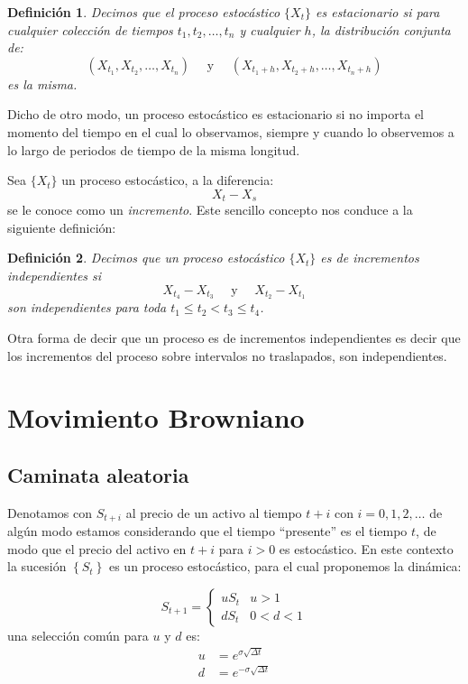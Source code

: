 \documentclass{extreport}
\theoremstyle{definicion}
\newtheorem{definition}{Definición}[chapter]
\theoremstyle{propiedad}
\theoremstyle{teorema}
\begin{document}
\begin{definition}
Decimos que el proceso estocástico $\{X_t\}$ es \emph{estacionario} si para cualquier colección de tiempos $t_1, t_2, \ldots, t_n$ y cualquier $h$, la distribución conjunta de:
$$
(X_{t_1}, X_{t_2}, \ldots, X_{t_n}) \quad\text{ y }\quad (X_{t_1+h}, X_{t_2+h}, \ldots, X_{t_n+h})
$$
es la misma.
\end{definition}

Dicho de otro modo, un proceso estocástico es estacionario si no importa el momento del tiempo en el cual lo observamos, siempre y cuando lo observemos a lo largo de periodos de tiempo de la misma longitud. 

Sea $\{X_t\}$ un proceso estocástico, a la diferencia:
$$
X_t-X_s
$$
se le conoce como un \emph{incremento}. Este sencillo concepto nos conduce a la siguiente definición:
 \begin{definition}
     Decimos que un proceso estocástico $\{X_t\}$ es de \emph{incrementos independientes} si
     $$
     X_{t_4}- X_{t_3} \quad\text{ y }\quad X_{t_2}-X_{t_1}
     $$
     son independientes para toda $t_1 \leq t_2 < t_3\leq t_4$.
 \end{definition}
 Otra forma de decir que un proceso es de incrementos independientes es decir que los incrementos del proceso sobre intervalos no traslapados, son independientes.

\chapter{Movimiento Browniano}
\section{Caminata aleatoria}

Denotamos con $S_{t+i}$ al  precio de un activo al tiempo $t+i$ con $i=0,1,2,\ldots$ de algún modo estamos considerando que el tiempo “presente” es el tiempo $t$, de modo que el precio del activo en $t+i$ para $i>0$ es estocástico. En este contexto  la sucesión $\left\{S_t\right\}$ es un proceso estocástico, para el cual proponemos la dinámica: 

$$
S_{t+1} = \begin{cases}
    uS_t & u>1 \\ 
    dS_t & 0<d<1
\end{cases}
$$
una selección común para $u$ y $d$ es:
\begin{align*}
    u  & = e^{\sigma \sqrt{\Delta t}}\\
    d  & = e^{-\sigma \sqrt{\Delta t}}
\end{align*}
\end{document}
